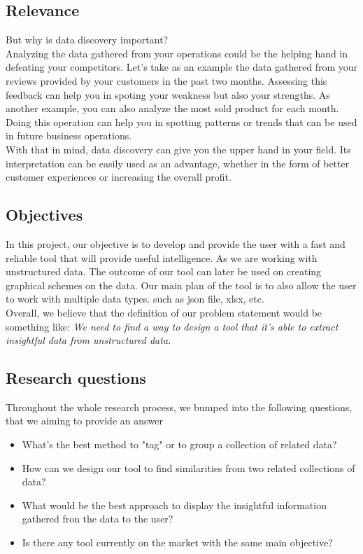 \subsection{Relevance}
But why is data discovery important? 
\vspace{5mm} %
\\Analyzing the data gathered from your operations could be the helping hand in defeating your competitors. Let's take as an example the data gathered from your reviews provided by your customers in the past two months. Assessing this feedback can help you in spoting your weakness but also your strengths. As another example, you can also analyze the most sold product for each month. Doing this operation can help you in spotting patterns or trends that can be used in future business operations. 
\vspace{5mm} %
\\With that in mind, data discovery can give you the upper hand in your field. Its interpretation can be easily used as an advantage, whether in the form of better customer experiences or increasing the overall profit.

\subsection{Objectives}
In this project, our objective is to develop and provide the user with a fast and reliable tool that will provide useful intelligence. As we are working with unstructured data. The outcome of our tool can later be used on creating graphical schemes on the data. Our main plan of the tool is to also allow the user to work with multiple data types. such as json file, xlsx, etc.
\vspace{5mm} %
\\Overall, we believe that the definition of our problem statement would be something like: \textit{We need to find a way to design a tool that it's able to extract insightful data from unstructured data.}

\subsection{Research questions}
Throughout the whole research process, we bumped into the following questions, that we aiming to provide an answer 
\begin{itemize}
    \item What's the best method to "tag" or to group a collection of related data?
    \item How can we design our tool to find similarities from two related collections of data?
    \item What would be the best approach to display the insightful information gathered fron the data to the user?
    \item Is there any tool currently on the market with the same main objective?
\end{itemize}

